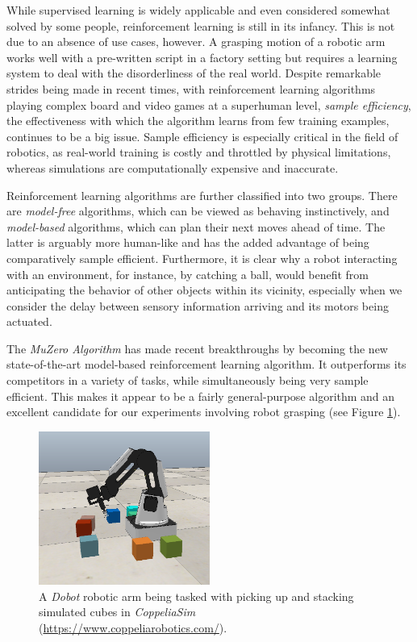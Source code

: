 While supervised learning is widely applicable and even considered somewhat solved by some people, reinforcement learning is still in its infancy. This is not due to an absence of use cases, however. A grasping motion of a robotic arm works well with a pre-written script in a factory setting but requires a learning system to deal with the disorderliness of the real world. Despite remarkable strides being made in recent times, with reinforcement learning algorithms playing complex board and video games at a superhuman level, \textit{sample efficiency}, the effectiveness with which the algorithm learns from few training examples, continues to be a big issue. Sample efficiency is especially critical in the field of robotics, as real-world training is costly and throttled by physical limitations, whereas simulations are computationally expensive and inaccurate.

Reinforcement learning algorithms are further classified into two groups. There are \textit{model-free} algorithms, which can be viewed as behaving instinctively, and \textit{model-based} algorithms, which can plan their next moves ahead of time. The latter is arguably more human-like and has the added advantage of being comparatively sample efficient. Furthermore, it is clear why a robot interacting with an environment, for instance, by catching a ball, would benefit from anticipating the behavior of other objects within its vicinity, especially when we consider the delay between sensory information arriving and its motors being actuated.

The \textit{MuZero Algorithm} \cite{muzero} has made recent breakthroughs by becoming the new state-of-the-art model-based reinforcement learning algorithm. It outperforms its competitors in a variety of tasks, while simultaneously being very sample efficient. This makes it appear to be a fairly general-purpose algorithm and an excellent candidate for our experiments involving robot grasping (see Figure \ref{fig:cube_stacking}).
\begin{figure}[b!]
    \centering
    \includegraphics[width=0.5\textwidth]{assets/cube_stacking.png}
    \caption{A \textit{Dobot} robotic arm being tasked with picking up and stacking simulated cubes in \textit{CoppeliaSim} (\url{https://www.coppeliarobotics.com/}).}
    \label{fig:cube_stacking}
\end{figure}

